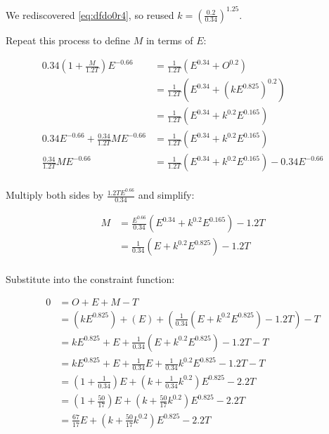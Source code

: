 \documentclass{article}
\begin{document}
We rediscovered \eqref{eq:dfdo0r4}, so reused $k = \left(\frac{0.2}{0.34}\right)^{1.25}$.

\hrulefill

Repeat this process to define $M$ in terms of $E$:

\begin{equation}\label{eq:3lagrange6}
  \begin{split}
    0.34\left( 1 + \frac{M}{1.2 T} \right)E^{-0.66} & = \frac{1}{1.2 T}\left( E^{0.34} + O^{0.2} \right) \\
    & = \frac{1}{1.2 T}\left( E^{0.34} + (kE^{0.825})^{0.2} \right) \\
    & = \frac{1}{1.2 T}\left( E^{0.34} + k^{0.2}E^{0.165} \right) \\
    0.34E^{-0.66} + \frac{0.34}{1.2 T}M E^{-0.66} & = \frac{1}{1.2 T}\left( E^{0.34} + k^{0.2}E^{0.165} \right) \\
    \frac{0.34}{1.2 T}M E^{-0.66} & = \frac{1}{1.2 T}\left( E^{0.34} + k^{0.2}E^{0.165} \right) - 0.34E^{-0.66} \\
  \end{split}
\end{equation}

Multiply both sides by $\frac{1.2 T E^{0.66}}{0.34}$ and simplify:

\begin{equation}\label{eq:3lagrange7}
  \begin{split}
    M & = \frac{E^{0.66}}{0.34}\left( E^{0.34} + k^{0.2}E^{0.165} \right) - 1.2 T \\
    & = \frac{1}{0.34}\left( E + k^{0.2}E^{0.825} \right) - 1.2 T \\
  \end{split}
\end{equation}

\hrulefill

Substitute into the constraint function:

\begin{equation}\label{eq:3lagrange8}
  \begin{split}
    0 & = O + E + M - T \\
    & = \left( kE^{0.825} \right) + \left( E \right) + \left( \frac{1}{0.34}\left( E + k^{0.2}E^{0.825} \right) - 1.2 T \right) - T \\
    & = kE^{0.825} + E + \frac{1}{0.34}\left( E + k^{0.2}E^{0.825} \right) - 1.2 T - T \\
    & = kE^{0.825} + E + \frac{1}{0.34}E + \frac{1}{0.34}k^{0.2}E^{0.825} - 1.2 T - T \\
    & = \left( 1 + \frac{1}{0.34} \right)E + (k + \frac{1}{0.34}k^{0.2})E^{0.825} - 2.2 T \\
    & = \left( 1 + \frac{50}{17} \right)E + (k + \frac{50}{17}k^{0.2})E^{0.825} - 2.2 T \\
    & = \frac{67}{17}E + (k + \frac{50}{17}k^{0.2})E^{0.825} - 2.2 T \\
  \end{split}
\end{equation}
\end{document}
